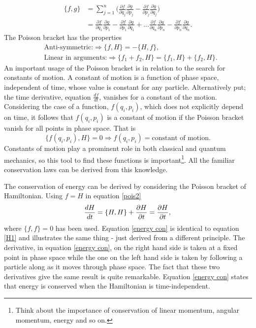\begin{equation}
	\begin{split}
		\{f,g\}
		&=\sum_{j=1}^{n}\bigg(\frac{\partial f}{\partial q_j}\frac{\partial g}{\partial p_j}-\frac{\partial f}{\partial p_j}\frac{\partial g}{\partial q_j}\bigg)\\
		&=\frac{\partial f}{\partial q_1}\frac{\partial g}{\partial p_1}-\frac{\partial f}{\partial p_1}\frac{\partial g}{\partial q_1}+...\frac{\partial f}{\partial q_n}\frac{\partial g}{\partial p_n}-\frac{\partial f}{\partial p_n}\frac{\partial g}{\partial q_n}.
	\end{split}
	\label{pois}
\end{equation} 
The Poisson bracket has the properties
\begin{equation}
	\begin{split}
		&\mbox{Anti-symmetric:} \Rightarrow \{f,H\}=-\{H,f\},\\
		&\mbox{Linear in arguments:} \Rightarrow \{f_1+f_2,H\}=\{f_1,H\}+\{f_2,H\}.
	\end{split}
\end{equation} 
An important usage of the Poisson bracket is in relation to the search for constants of motion. A constant of motion is a function of phase space, independent of time, whose value is constant for any particle. Alternatively put; the time derivative, equation $\frac{df}{dt}$, vanishes for a constant of the motion. Considering the case of a function, $f(q_i,p_i)$, which does not explicitly depend on time, it follows that $f(q_i,p_i)$ is a constant of motion if the Poisson bracket vanish for all points in phase space. That is
\begin{equation}
	\{f(q_i,p_i),H\}=0 \Rightarrow f(q_i,p_i)=\mbox{constant of motion}.
\end{equation} 
Constants of motion play a prominent role in both classical and quantum mechanics, so this tool to find these functions is important\footnote{Think about the importance of conservation of linear momentum, angular momentum, energy and so on.}. All the familiar conservation laws can be derived from this knowledge.

\begin{example}
	The conservation of energy can be derived by considering the Poisson bracket of Hamiltonian. Using $f=H$ in equation \eqref{pois2}
	\begin{equation}
		\frac{d H}{dt}=\{H,H\}+\frac{\partial H}{\partial t}=\frac{\partial H}{\partial t},\\
		\label{energy con}
	\end{equation} 
	where $\{f,f\}=0$ has been used. Equation \eqref{energy con} is identical to equation \eqref{H1} and illustrates the same thing - just derived from a different principle.	The derivative, in equation \eqref{energy con}, on the right hand side is taken at a fixed point in phase space while the one on the left hand side is taken by following a particle along as it moves through phase space. The fact that these two derivatives give the same result is quite remarkable. Equation \eqref{energy con} states that energy is conserved when the Hamiltonian is time-independent.
\end{example}

